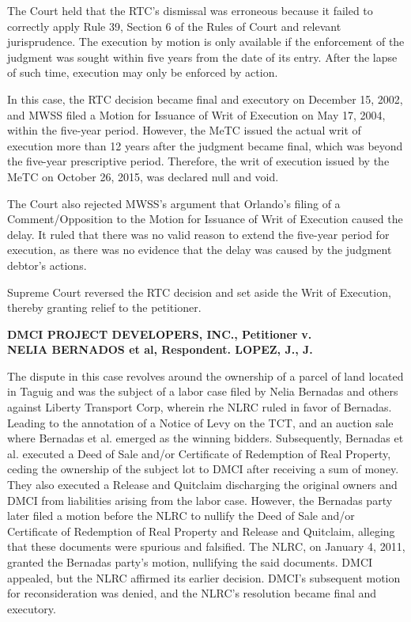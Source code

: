 \documentclass[
12pt,
oneside,
onehalfspacing,
headsepline
]{DigestCollection}
\begin{document}
The Court held that the RTC's dismissal was erroneous because it failed to correctly apply Rule 39, Section 6 of the Rules of Court and relevant jurisprudence. The execution by motion is only available if the enforcement of the judgment was sought within five years from the date of its entry. After the lapse of such time, execution may only be enforced by action. 

In this case, the RTC decision became final and executory on December 15, 2002, and MWSS filed a Motion for Issuance of Writ of Execution on May 17, 2004, within the five-year period. However, the MeTC issued the actual writ of execution more than 12 years after the judgment became final, which was beyond the five-year prescriptive period. Therefore, the writ of execution issued by the MeTC on October 26, 2015, was declared null and void.

The Court also rejected MWSS's argument that Orlando's filing of a Comment/Opposition to the Motion for Issuance of Writ of Execution caused the delay. It ruled that there was no valid reason to extend the five-year period for execution, as there was no evidence that the delay was caused by the judgment debtor's actions.

Supreme Court reversed the RTC decision and set aside the Writ of Execution, thereby granting relief to the petitioner.

\label{293df3b0-0a1d-11ef-932c-63c852f65e48}


\noindent\textbf{DMCI PROJECT DEVELOPERS, INC.}\noindent\textbf{, Petitioner }\noindent\textbf{ v. \\NELIA BERNADOS et al, Respondent. LOPEZ, J., J.}\vspace{0.4cm}

The dispute in this case revolves around the ownership of a parcel of land located in Taguig and was the subject of a labor case filed by Nelia Bernadas and others against Liberty Transport Corp, wherein rhe NLRC ruled in favor of Bernadas. Leading to the annotation of a Notice of Levy on the TCT, and an auction sale where Bernadas et al. emerged as the winning bidders. Subsequently, Bernadas et al. executed a Deed of Sale and/or Certificate of Redemption of Real Property, ceding the ownership of the subject lot to DMCI after receiving a sum of money. They also executed a Release and Quitclaim discharging the original owners and DMCI from liabilities arising from the labor case. However, the Bernadas party later filed a motion before the NLRC to nullify the Deed of Sale and/or Certificate of Redemption of Real Property and Release and Quitclaim, alleging that these documents were spurious and falsified. The NLRC, on January 4, 2011, granted the Bernadas party's motion, nullifying the said documents. DMCI appealed, but the NLRC affirmed its earlier decision. DMCI's subsequent motion for reconsideration was denied, and the NLRC's resolution became final and executory. 
\end{document}
